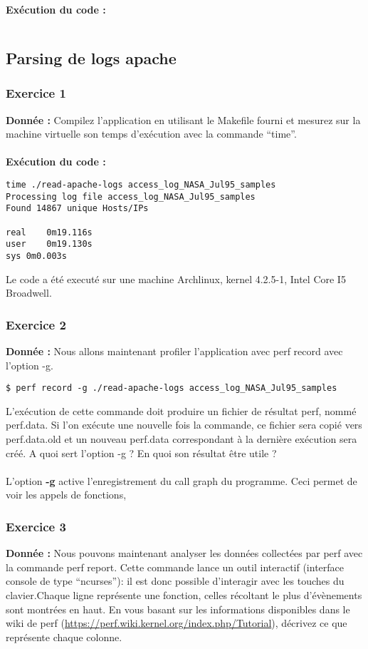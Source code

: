 \textbf{Exécution du code : } \\
\begin{lstlisting}

\end{lstlisting}

\subsection{Parsing de logs apache}
\subsubsection{Exercice 1}
\textbf{Donnée : } Compilez	l'application	en	utilisant	le	Makefile	fourni	et	mesurez sur	la	machine	virtuelle son	temps	
d'exécution	avec	la	commande	“time”.\\\\

\textbf{Exécution du code : } \\
\begin{lstlisting}
time ./read-apache-logs access_log_NASA_Jul95_samples 
Processing log file access_log_NASA_Jul95_samples
Found 14867 unique Hosts/IPs

real	0m19.116s
user	0m19.130s
sys	0m0.003s
\end{lstlisting}
Le code a été executé sur une machine Archlinux, kernel 4.2.5-1, Intel Core I5 Broadwell.

\subsubsection{Exercice 2}
\textbf{Donnée : } Nous	allons	maintenant	profiler	l'application	avec	perf	record	avec	l'option	-g.
\begin{lstlisting}
$ perf record -g ./read-apache-logs access_log_NASA_Jul95_samples
\end{lstlisting}
L'exécution	de	cette	commande	doit	produire	un	fichier	de	résultat	perf,	nommé	perf.data.	Si	l'on	
exécute	une	nouvelle	fois	la	commande,	ce	fichier	sera	copié	vers	perf.data.old et	un	nouveau	
perf.data	correspondant	à	la	dernière	exécution	sera	créé.
A	quoi	sert	l'option	-g	?	En	quoi	son	résultat	être	utile	?\\\\

L'option \textbf{-g} active l'enregistrement du call graph du programme. Ceci permet de voir les appels de fonctions, 

\subsubsection{Exercice 3}
\textbf{Donnée : } Nous	pouvons	maintenant	analyser	les	données	collectées	par	perf	avec	la	commande	perf	report.	
Cette	commande	lance	un	outil	interactif	(interface	console de	type	“ncurses”):	il	est	donc	possible	
d'interagir avec	les	touches	du	clavier.Chaque	ligne	représente	une	fonction,	celles	récoltant	le	plus	d'évènements	sont	montrées	en	haut.	
En	vous	basant sur	les	informations	disponibles	dans	le	wiki	de	perf	
(\url{https://perf.wiki.kernel.org/index.php/Tutorial}),	décrivez	ce	que	représente	chaque	colonne.\\\\

